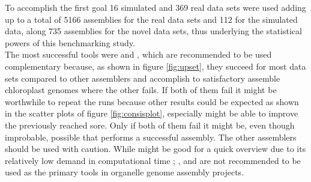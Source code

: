 To accomplish the first goal 16 simulated and 369 real data sets were used adding up to a
total of 5166 assemblies for the real data sets and 112 for the simulated data, along 735
assemblies for the novel data sets, thus underlying the statistical powers of this
benchmarking study.\\
The most successful tools were \go \hspace{0.25ex} and \fp, which are recommended to be
used complementary because, as shown in figure \ref{fig:upset}, they succeed for most data
sets compared to other assemblers and accomplish to satisfactory assemble chloroplast
genomes where the other fails. If both of them fail it might be worthwhile to repeat the
runs because other results could be expected as shown in the scatter plots of figure
\ref{fig:consisplot}, especially \fp \hspace{0.25ex} might be able to improve the
previously reached sore. Only if both of them fail it might be, even though improbable,
possible that \np \hspace{0.25ex} performs a successful assembly. The other
assemblers should be used with caution. While \ce \hspace{0.25ex} might be good for a
quick overview due to its relatively low demand in computational time
\cite{freudenthal2019landscape}; \cassp, \oa \hspace{0.25ex} and \ioga \hspace{0.25ex} are
not recommended to be used as the primary tools in organelle genome assembly projects.

